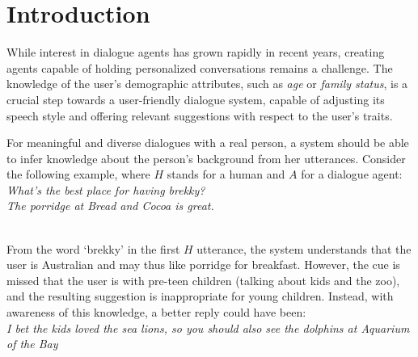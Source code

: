 \section{Introduction}

While interest in dialogue agents has grown rapidly in recent years, creating agents capable of holding personalized conversations remains a challenge. 
The knowledge of the user's demographic attributes, such as \textit{age} or \textit{family status}, is a crucial step towards a user-friendly dialogue system, capable of adjusting its speech style and offering relevant suggestions with respect to the user's traits.

For meaningful and diverse dialogues with a real person, a system should be able to infer knowledge about the person's background from her utterances. 
Consider the following example, where $H$ stands for a human and $A$ for a dialogue agent:\vspace{0.1cm}\\
\hspace*{0.3cm}{H:} {\em What's the best place for having brekky?}\\
\hspace*{0.3cm}{A:} {\em The porridge at Bread and Cocoa is great.}\\
\\
\vspace{0.05cm}

\noindent From the word `brekky' in the first $H$ utterance, 
the system understands that the user is Australian
and may thus like porridge for breakfast. 
However, the 
cue is missed that the user 
{is with pre-teen children (talking about kids and the zoo)},
and the resulting suggestion is inappropriate for young children. 
Instead, with awareness of this knowledge, a better reply could have been:\vspace{0.1cm}\\
\hspace*{0.3cm}{A:} {\em I bet the kids loved the sea lions, so you should also see the dolphins at Aquarium of the Bay}
\vspace{0.1cm}

